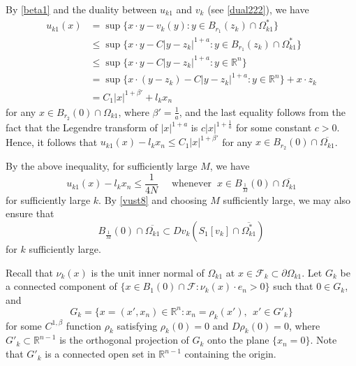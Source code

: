 \documentclass[11pt]{amsart}
\theoremstyle{plain}
\newcommand{\0}{\textbf{0}}
\numberwithin{equation}{section}
\numberwithin{equation}{section}
\numberwithin{figure}{section}
\begin{document}
By \eqref{beta1} and the duality between \( u_{k1} \) and \( v_k \) (see \eqref{dual222}), we have
\begin{align*}
u_{k1}(x) &= \sup\{x\cdot y - v_k(y) : y \in B_{r_1}(z_k) \cap \Omega_{k1}^*\} \\
&\leq \sup\{x\cdot y -  C|y - z_k|^{1+a} : y \in B_{r_1}(z_k) \cap \Omega_{k1}^*\} \\
&\leq \sup\{x\cdot y - C|y - z_k|^{1+a} : y \in \mathbb{R}^n\} \\
&= \sup\{x\cdot (y - z_k) - C|y - z_k|^{1+a} : y \in  \mathbb{R}^n\} + x\cdot z_k \\
&= C_1|x|^{1+\beta'}+l_kx_n
\end{align*}
for any \( x \in B_{r_2}(0)\cap\Omega_{k1} \), where \( \beta' = \frac{1}{a} \), and the last equality follows from the fact
that the Legendre transform of \( |x|^{1+a} \) is \( c|x|^{1+\frac{1}{a}} \) for some constant \( c>0 \).
Hence, it follows that \( u_{k1}(x) - l_kx_n \leq C_1|x|^{1+\beta'} \) for any \( x \in B_{r_2}(0)\cap\overline{\Omega_{k1}} \).

By the above inequality, for sufficiently large \( M \), we have
\begin{equation}\label{vust4}
  u_{k1}(x) - l_kx_n \leq \frac{1}{4N}\quad\text{ whenever }\ x \in B_{\frac{1}{M}}(0) \cap \overline{\Omega_{k1}}
\end{equation}
for sufficiently large $k.$
 By \eqref{vust8} and choosing \( M \) sufficiently large, we may also ensure that
\begin{equation}\label{cvk11}
  B_{\frac{1}{M}}(0) \cap \overline{\Omega_{k1}} \subset Dv_k(S_1[v_k] \cap \overline{\Omega^*_{k1}})
\end{equation}
for \( k \) sufficiently large.


Recall that \(\nu_k(x)\) is the unit inner normal of \(\Omega_{k1}\) at \(x \in \mathcal{F}_k \subset \partial \Omega_{k1}\). 
Let \(G_k\) be a connected component of
\(\{x \in B_1(0) \cap \mathcal{F}: \nu_k(x) \cdot e_n > 0\}\) such that \(0 \in G_k\), and 
\[ G_k  = \{ x = (x', x_n) \in \mathbb{R}^n : x_n = \rho_k(x'),\ \ x' \in G'_k \} \] 
for some 
\( C^{1,\beta} \) function \( \rho_k \) satisfying \( \rho_k(0) = 0 \) and \( D\rho_k(0) = 0 \), where \( G'_k \subset \mathbb{R}^{n-1} \) is the orthogonal projection of \( G_k \) onto the plane \( \{x_n = 0\} \). Note that \( G'_k \) is a connected open set in $\mathbb{R}^{n-1}$ containing the origin.
\end{document}
